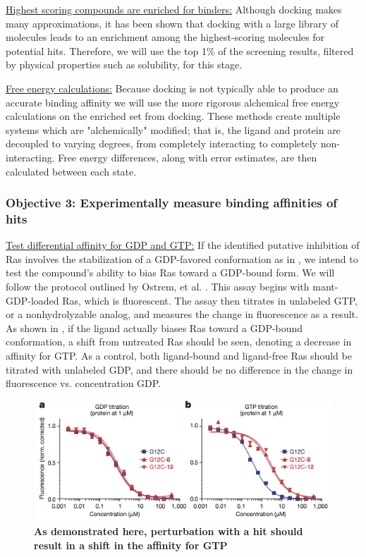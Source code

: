\documentclass[12pt]{article}
\begin{document}
\underline{Highest scoring compounds are enriched for binders:} Although docking makes many approximations, it has been shown that docking with a large library of molecules leads to an enrichment among the highest-scoring molecules for potential hits. Therefore, we will use the top 1\% of the screening results, filtered by physical properties such as solubility, for this stage.

\underline{Free energy calculations:} Because docking is not typically able to produce an accurate binding affinity\cite{warren2006} we will use the more rigorous alchemical free energy calculations on the enriched set from docking. These methods create multiple systems which are "alchemically" modified; that is, the ligand and protein are decoupled to varying degrees, from completely interacting to completely non-interacting. Free energy differences, along with error estimates, are then calculated between each state\cite{boresch2013}.

\subsubsection*{Objective 3: Experimentally measure binding affinities of hits}

\underline{Test differential affinity for GDP and GTP:} If the identified putative inhibition of Ras involves the stabilization of a GDP-favored conformation as in \cite{ostrem2013}, we intend to test the compound's ability to bias Ras toward a GDP-bound form. We will follow the protocol outlined by Ostrem, et al. \cite{ostrem2013}. This assay begins with mant-GDP-loaded Ras, which is fluorescent. The assay then titrates in unlabeled GTP, or a nonhydrolyzable analog, and measures the change in fluorescence as a result. As shown in , if the ligand actually biases Ras toward a GDP-bound conformation, a shift from untreated Ras should be seen, denoting a decrease in affinity for GTP. As a control, both ligand-bound and ligand-free Ras should be titrated with unlabeled GDP, and there should be no difference in the change in fluorescence vs. concentration GDP. 

\begin{figure}
\includegraphics[width=\textwidth]{shokatassay.png}
\caption{\textbf{As demonstrated here, perturbation with a hit should result in a shift in the affinity for GTP} \cite{ostrem2013}}
\label{gtpassay}
\end{figure}
\end{document}
